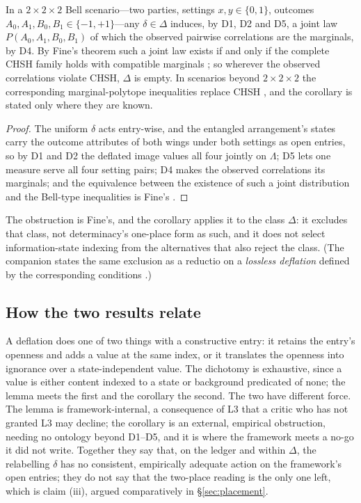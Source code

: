 \begin{corollary}\label{cor:bell}
In a $2 \times 2 \times 2$ Bell scenario---two parties, settings $x, y \in \{0,1\}$, outcomes $A_0, A_1, B_0, B_1 \in \{-1, +1\}$---any $\delta \in \Delta$ induces, by D1, D2 and D5, a joint law $P(A_0, A_1, B_0, B_1)$ of which the observed pairwise correlations are the marginals, by D4. By Fine's theorem such a joint law exists if and only if the complete CHSH family holds with compatible marginals \cite{fine1982hidden}; so wherever the observed correlations violate CHSH, $\Delta$ is empty. In scenarios beyond $2 \times 2 \times 2$ the corresponding marginal-polytope inequalities replace CHSH \cite{pitowsky1994george}, and the corollary is stated only where they are known.
\end{corollary}
\begin{proof}
The uniform $\delta$ acts entry-wise, and the entangled arrangement's states carry the outcome attributes of both wings under both settings as open entries, so by D1 and D2 the deflated image values all four jointly on $\Lambda$; D5 lets one measure serve all four setting pairs; D4 makes the observed correlations its marginals; and the equivalence between the existence of such a joint distribution and the Bell-type inequalities is Fine's \cite{fine1982hidden, pitowsky1994george}.
\end{proof}

\noindent The obstruction is Fine's, and the corollary applies it to the class $\Delta$: it excludes that class, not determinacy's one-place form as such, and it does not select information-state indexing from the alternatives that also reject the class. (The companion states the same exclusion as a reductio on a \emph{lossless deflation} defined by the corresponding conditions \cite{Aethus}.)

\subsection{How the two results relate}\label{sec:relation}

A deflation does one of two things with a constructive entry: it retains the entry's openness and adds a value at the same index, or it translates the openness into ignorance over a state-independent value. The dichotomy is exhaustive, since a value is either content indexed to a state or background predicated of none; the lemma meets the first and the corollary the second. The two have different force. The lemma is framework-internal, a consequence of L3 that a critic who has not granted L3 may decline; the corollary is an external, empirical obstruction, needing no ontology beyond D1--D5, and it is where the framework meets a no-go it did not write. Together they say that, on the ledger and within $\Delta$, the relabelling $\delta$ has no consistent, empirically adequate action on the framework's open entries; they do not say that the two-place reading is the only one left, which is claim (iii), argued comparatively in \S\ref{sec:placement}.

